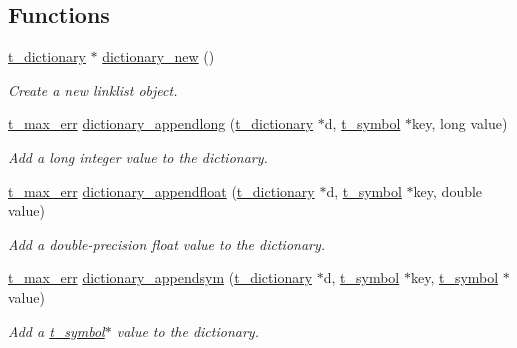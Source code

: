 \subsection*{Functions}
\begin{DoxyCompactItemize}
\item 
\hyperlink{structt__dictionary}{t\_\-dictionary} $\ast$ \hyperlink{group__dictionary_ga9d89ea4cf5b0aaf87fba6027c3ec223c}{dictionary\_\-new} ()
\begin{DoxyCompactList}\small\item\em Create a new linklist object. \item\end{DoxyCompactList}\item 
\hyperlink{group__datatypes_ga73edaae82b318855cc09fac994918165}{t\_\-max\_\-err} \hyperlink{group__dictionary_gaf401b30bed5b47e5defd1421e7f14cce}{dictionary\_\-appendlong} (\hyperlink{structt__dictionary}{t\_\-dictionary} $\ast$d, \hyperlink{structt__symbol}{t\_\-symbol} $\ast$key, long value)
\begin{DoxyCompactList}\small\item\em Add a long integer value to the dictionary. \item\end{DoxyCompactList}\item 
\hyperlink{group__datatypes_ga73edaae82b318855cc09fac994918165}{t\_\-max\_\-err} \hyperlink{group__dictionary_ga4250c0f1a0c83b1585012ea65f172e13}{dictionary\_\-appendfloat} (\hyperlink{structt__dictionary}{t\_\-dictionary} $\ast$d, \hyperlink{structt__symbol}{t\_\-symbol} $\ast$key, double value)
\begin{DoxyCompactList}\small\item\em Add a double-\/precision float value to the dictionary. \item\end{DoxyCompactList}\item 
\hyperlink{group__datatypes_ga73edaae82b318855cc09fac994918165}{t\_\-max\_\-err} \hyperlink{group__dictionary_ga5df20e3ac212f70d53469a3f091eae56}{dictionary\_\-appendsym} (\hyperlink{structt__dictionary}{t\_\-dictionary} $\ast$d, \hyperlink{structt__symbol}{t\_\-symbol} $\ast$key, \hyperlink{structt__symbol}{t\_\-symbol} $\ast$value)
\begin{DoxyCompactList}\small\item\em Add a \hyperlink{structt__symbol}{t\_\-symbol}$\ast$ value to the dictionary. \item\end{DoxyCompactList}\item 

\end{DoxyCompactItemize}
